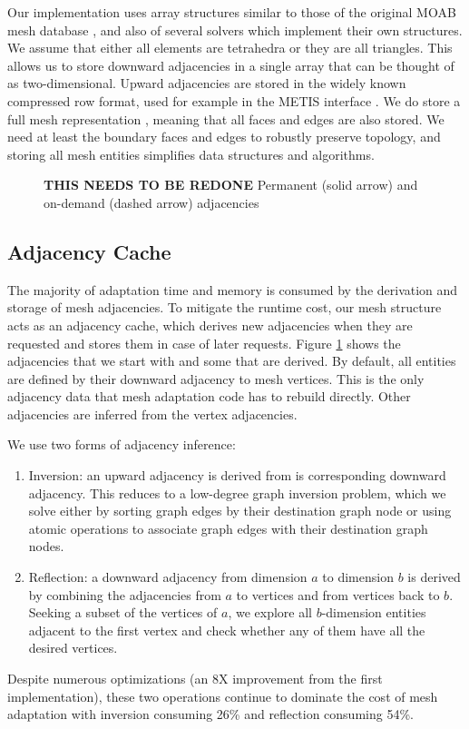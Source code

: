 Our implementation uses array structures similar to those
of the original MOAB mesh database \cite{tautges2004moab},
and also of several solvers which implement their own structures.
We assume that either all elements are tetrahedra or they are all triangles.
This allows us to store downward adjacencies in a single array
that can be thought of as two-dimensional.
Upward adjacencies are stored in the widely known compressed row format,
used for example in the METIS interface \cite{METIS}.
We do store a full mesh representation \cite{beall1997general}, meaning
that all faces and edges are also stored.
We need at least the boundary faces and edges to robustly preserve
topology, and storing all mesh entities simplifies data structures
and algorithms.

\begin{figure}[t]\vspace*{4pt}
\caption{{\bf THIS NEEDS TO BE REDONE} Permanent (solid arrow) and on-demand (dashed arrow) adjacencies}\vspace*{-6pt}
\label{fig:adjs}
\end{figure}

\subsection{Adjacency Cache}

The majority of adaptation time and memory is consumed by the
derivation and storage of mesh adjacencies.
To mitigate the runtime cost, our mesh structure acts as an adjacency cache,
which derives new adjacencies when they are requested and stores
them in case of later requests.
Figure \ref{fig:adjs} shows the adjacencies that we start with and some
that are derived.
By default, all entities are defined by their downward adjacency to mesh vertices.
This is the only adjacency data that mesh adaptation code has to rebuild
directly.
Other adjacencies are inferred from the vertex adjacencies.

We use two forms of adjacency inference:
\begin{enumerate}
\item Inversion: an upward adjacency is derived from is corresponding downward
adjacency. This reduces to a low-degree graph inversion problem, which we
solve either by sorting graph edges by their destination graph node or using
atomic operations to associate graph edges with their destination graph nodes.
\item Reflection: a downward adjacency from dimension $a$ to dimension $b$
is derived by combining the adjacencies from $a$ to vertices and from
vertices back to $b$.
Seeking a subset of the vertices of $a$, we explore all $b$-dimension entities
adjacent to the first vertex and check whether any of them have all the
desired vertices.
\end{enumerate}
Despite numerous optimizations (an 8X improvement from the first implementation),
these two operations continue to dominate the cost of mesh adaptation
with inversion consuming 26\% and reflection consuming 54\%.

